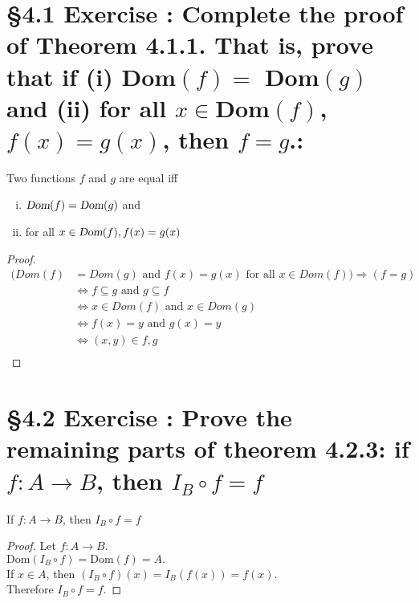 \documentclass[a4paper,11pt]{article}
\begin{document}
\section*{\S 4.1 Exercise : Complete the proof of Theorem 4.1.1. That is, prove that if {(i)} Dom\({(f)} =\) Dom\({(g)}\) and (ii) for all \(x \in\)Dom\({(f)}\), \(f{(x)}=g{(x)}\), then \(f=g\).:}
\begin{theorem1}
  Two functions \(f\) and \(g\) are equal iff
  \begin{enumerate}[(i)]
    \item \(\textsl{Dom}{(f)} = \textsl{Dom}{(g)}\) and
    \item for all \(x \in \textsl{Dom}{(f)}, f{(x)}=g{(x)}\)
  \end{enumerate}
  \begin{proof}
\begin{align*}
  (Dom{(f)} &= Dom{(g)} \text{ and } f{(x)}=g{(x)} \text{ for all } x \in Dom{(f)}) 
  \Rightarrow {(f = g)}\\
  &\Leftrightarrow f \subseteq g \text{ and } g \subseteq f\\
  &\Leftrightarrow x \in Dom{(f)} \text{ and } x \in Dom{(g)}\\
  &\Leftrightarrow f{(x)} = y \text{ and } g{(x)} = y\\
  &\Leftrightarrow {(x,y)} \in f,g \\
\end{align*}
  \end{proof}
\end{theorem1}
\newpage
\setcounter{ProblemCounter}{6}
\section*{\S 4.2 Exercise : Prove the remaining parts of theorem 4.2.3: if \(f:A\rightarrow B\), then \(I_{B} \circ 
f=f\)}
\begin{theorem1}
If \(f:A\rightarrow B\), then \(I_{B} \circ 
f=f\)
   \begin{proof}
Let \(f: A \rightarrow B\).\\
\(\text{Dom}{(I_{B} \circ f)} = \text{Dom}{(
f)} = A.\)\\
If \(x \in A\), then \({(I_{B} \circ f)}{(x)} = I_{B}{(f{(x)})} = f{(x)}\).\\
Therefore \(I_{B} \circ f = f\).
     \end{proof}
  \end{theorem1}
\newpage
\setcounter{ProblemCounter}{7}
\end{document}
